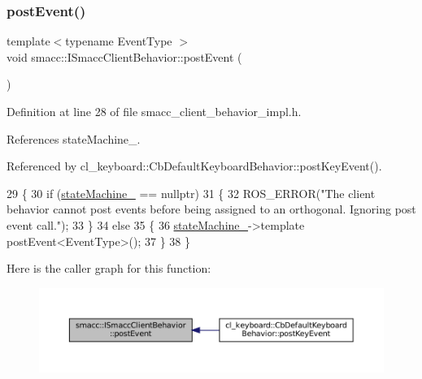 \subsubsection{\texorpdfstring{post\+Event()}{postEvent()}\hspace{0.1cm}{\footnotesize\ttfamily [2/2]}}
{\footnotesize\ttfamily template$<$typename Event\+Type $>$ \\
void smacc\+::\+I\+Smacc\+Client\+Behavior\+::post\+Event (\begin{DoxyParamCaption}{ }\end{DoxyParamCaption})\hspace{0.3cm}{\ttfamily [protected]}}



Definition at line 28 of file smacc\+\_\+client\+\_\+behavior\+\_\+impl.\+h.



References state\+Machine\+\_\+.



Referenced by cl\+\_\+keyboard\+::\+Cb\+Default\+Keyboard\+Behavior\+::post\+Key\+Event().


\begin{DoxyCode}
29 \{
30     \textcolor{keywordflow}{if} (\hyperlink{classsmacc_1_1ISmaccClientBehavior_a0fea65db292a8bb3dfba3e5840491d79}{stateMachine\_} == \textcolor{keyword}{nullptr})
31     \{
32         ROS\_ERROR(\textcolor{stringliteral}{"The client behavior cannot post events before being assigned to an orthogonal. Ignoring
       post event call."});
33     \}
34     \textcolor{keywordflow}{else}
35     \{
36         \hyperlink{classsmacc_1_1ISmaccClientBehavior_a0fea65db292a8bb3dfba3e5840491d79}{stateMachine\_}->template postEvent<EventType>();
37     \}
38 \}
\end{DoxyCode}
Here is the caller graph for this function\+:
\nopagebreak
\begin{figure}[H]
\begin{center}
\leavevmode
\includegraphics[width=350pt]{classsmacc_1_1ISmaccClientBehavior_a5db577c585935114058770f2b7242f8a_icgraph}
\end{center}
\end{figure}
\mbox{\label{classsmacc_1_1ISmaccClientBehavior_a32b16e99e3b4cb289414203dc861a440}} 

